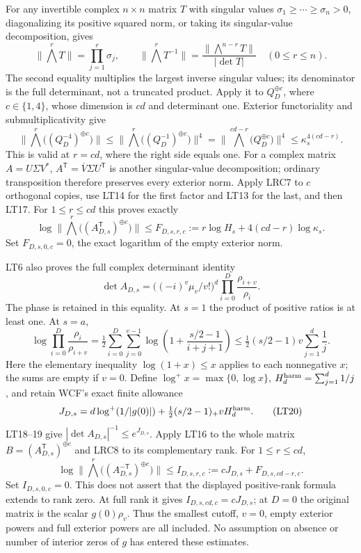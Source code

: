 For any invertible complex $n\times n$ matrix $T$ with singular
values $\sigma_1\ge\cdots\ge\sigma_n>0$, diagonalizing its
positive squared norm, or taking its singular-value decomposition,
gives
\[
 \|\textstyle\bigwedge^rT\|=\prod_{j=1}^r\sigma_j,
 \qquad
 \|\textstyle\bigwedge^rT^{-1}\|
 =\frac{\|\bigwedge^{n-r}T\|}{|\det T|}
 \quad(0\le r\le n).                                  \tag{LT16}
\]
The second equality multiplies the largest inverse singular values;
its denominator is the full determinant, not a truncated product.
Apply it to $Q_D^{\oplus c}$, where $c\in\{1,4\}$, whose dimension
is $cd$ and determinant one. Exterior functoriality and
submultiplicativity give
\[
 \|\bigwedge^r\bigl((Q_D^{-4})^{\oplus c}\bigr)\|
 \le\|\bigwedge^r\bigl((Q_D^{-1})^{\oplus c}\bigr)\|^4
 =\|\bigwedge^{cd-r}\bigl(Q_D^{\oplus c}\bigr)\|^4
 \le\kappa_s^{4(cd-r)}.                                 \tag{LT17}
\]
This is valid at $r=cd$, where the right side equals one.
For a complex matrix $A=U\Sigma V^*$,
$A^{\mathsf T}=\overline V\Sigma U^{\mathsf T}$ is another
singular-value decomposition; ordinary transposition therefore
preserves every exterior norm. Apply LRC7 to $c$ orthogonal copies,
use LT14 for the first factor and LT13 for the last, and then LT17.
For $1\le r\le cd$ this proves exactly
\[
 \boxed{\log\|\bigwedge^r\bigl((A_{D,s}^{\mathsf T})^{\oplus c}\bigr)\|
 \le F_{D,s,r,c}:=r\log H_s+4(cd-r)\log\kappa_s.}         \tag{LRC8}
\]
Set $F_{D,s,0,c}=0$, the exact logarithm of the empty exterior norm.

LT6 also proves the full complex determinant identity
\[
 \det A_{D,s}=\bigl((-i)^v\mu_v/v!\bigr)^d
                         \prod_{i=0}^{D}\frac{\rho_{i+v}}{\rho_i}.
                                                               \tag{LT18}
\]
The phase is retained in this equality. At $s=1$ the product of
positive ratios is at least one. At $s=a$,
\[
 \log\prod_{i=0}^{D}\frac{\rho_i}{\rho_{i+v}}
 =\tfrac12\sum_{i=0}^{D}\sum_{j=0}^{v-1}
       \log\left(1+\frac{s/2-1}{i+j+1}\right)
 \le\tfrac12(s/2-1)v\sum_{j=1}^d\frac1j .                \tag{LT19}
\]
Here the elementary inequality $\log(1+x)\le x$ applies to each
nonnegative $x$; the sums are empty if $v=0$.
Define $\log^+x=\max\{0,\log x\}$, $H_d^{\rm harm}=\sum_{j=1}^d1/j$,
and retain WCF's exact finite allowance
\[
 J_{D,s}=d\log^+(1/|g(0)|)
       +\tfrac12(s/2-1)_+vH_d^{\rm harm}.                \tag{LT20}
\]
LT18--19 give $|\det A_{D,s}|^{-1}\le e^{J_{D,s}}$.
Apply LT16 to the whole matrix
$B=(A_{D,s}^{\mathsf T})^{\oplus c}$ and LRC8 to its complementary
rank. For $1\le r\le cd$,
\[
 \boxed{\log\|\bigwedge^r\bigl((A_{D,s}^{-\mathsf T})^{\oplus c}\bigr)\|
 \le I_{D,s,r,c}:=cJ_{D,s}+F_{D,s,cd-r,c}.}              \tag{LRC9}
\]
Set $I_{D,s,0,c}=0$. This does not assert that the displayed
positive-rank formula extends to rank zero. At full rank it gives
$I_{D,s,cd,c}=cJ_{D,s}$; at $D=0$ the original matrix is the scalar
$g(0)\rho_v$. Thus the smallest cutoff, $v=0$, empty exterior powers
and full exterior powers are all included. No assumption on absence
or number of interior zeros of $g$ has entered these estimates.

